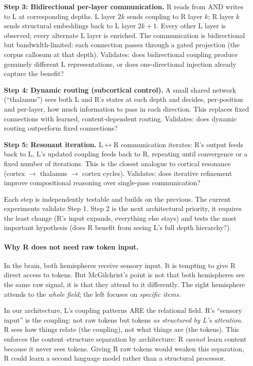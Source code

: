 \documentclass[11pt, a4paper]{article}
\theoremstyle{plain}
\theoremstyle{definition}
\theoremstyle{remark}
\begin{document}
\textbf{Step 3: Bidirectional per-layer communication.}
R reads from AND writes to L at corresponding depths.
L layer $2k$ sends coupling to R layer $k$; R layer $k$ sends structural embeddings back to L layer $2k{+}1$.
Every other L layer is observed; every alternate L layer is enriched.
The communication is bidirectional but bandwidth-limited: each connection passes through a gated projection (the corpus callosum at that depth).
Validates: does bidirectional coupling produce genuinely different L representations, or does one-directional injection already capture the benefit?

\textbf{Step 4: Dynamic routing (subcortical control).}
A small shared network (``thalamus'') sees both L and R's states at each depth and decides, per-position and per-layer, how much information to pass in each direction.
This replaces fixed connections with learned, content-dependent routing.
Validates: does dynamic routing outperform fixed connections?

\textbf{Step 5: Resonant iteration.}
L$\leftrightarrow$R communication iterates: R's output feeds back to L, L's updated coupling feeds back to R, repeating until convergence or a fixed number of iterations.
This is the closest analogue to cortical resonance (cortex $\to$ thalamus $\to$ cortex cycles).
Validates: does iterative refinement improve compositional reasoning over single-pass communication?

Each step is independently testable and builds on the previous.
The current experiments validate Step 1.
Step 2 is the next architectural priority, it requires the least change (R's input expands, everything else stays) and tests the most important hypothesis (does R benefit from seeing L's full depth hierarchy?).

\paragraph{Why R does not need raw token input.}
In the brain, both hemispheres receive sensory input.
It is tempting to give R direct access to tokens.
But McGilchrist's point is not that both hemispheres see the same raw signal, it is that they attend to it differently.
The right hemisphere attends to the \emph{whole field}; the left focuses on \emph{specific items}.

In our architecture, L's coupling patterns ARE the relational field.
R's ``sensory input'' is the coupling: not raw tokens but tokens \emph{as structured by L's attention}.
R sees how things relate (the coupling), not what things are (the tokens).
This enforces the content--structure separation by architecture: R \emph{cannot} learn content because it never sees tokens.
Giving R raw tokens would weaken this separation, R could learn a second language model rather than a structural processor.
\end{document}
